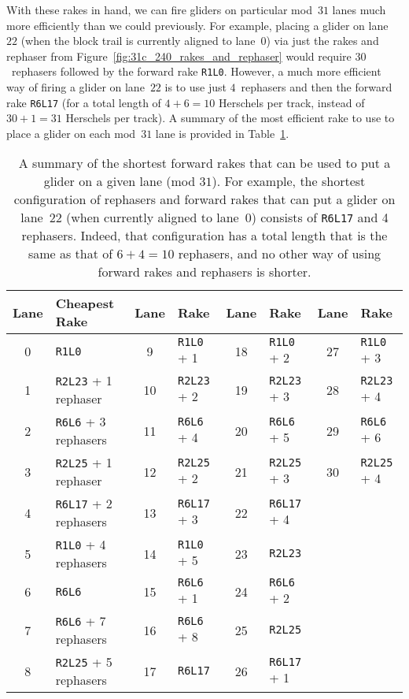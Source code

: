 With these rakes in hand, we can fire gliders on particular mod~$31$ lanes much more efficiently than we could previously. For example, placing a glider on lane~$22$ (when the block trail is currently aligned to lane~$0$) via just the rakes and rephaser from Figure~\ref{fig:31c_240_rakes_and_rephaser} would require $30$~rephasers followed by the forward rake \texttt{R1L0}. However, a much more efficient way of firing a glider on lane~$22$ is to use just $4$~rephasers and then the forward rake \texttt{R6L17} (for a total length of $4 + 6 = 10$ Herschels per track, instead of $30 + 1 = 31$ Herschels per track). A summary of the most efficient rake to use to place a glider on each mod~$31$ lane is provided in Table~\ref{tab:silverfish_forward_rakes}.

\begin{table}[!htbp]
	\centering
	\begin{tabular}{c l | c l | c l | c l}
		\toprule
		Lane & Cheapest Rake & Lane & Rake & Lane & Rake & Lane & Rake \\ \midrule
		0 & \texttt{R1L0} & 9 & \texttt{R1L0} + 1 & 18 & \texttt{R1L0} + 2 & 27 & \texttt{R1L0} + 3 \\
		1 & \texttt{R2L23} + 1 rephaser & 10 & \texttt{R2L23} + 2 & 19 & \texttt{R2L23} + 3 & 28 & \texttt{R2L23} + 4\\
		2 & \texttt{R6L6} + 3 rephasers & 11 & \texttt{R6L6} + 4 & 20 & \texttt{R6L6} + 5 & 29 & \texttt{R6L6} + 6 \\
		3 & \texttt{R2L25} + 1 rephaser & 12 & \texttt{R2L25} + 2 & 21 & \texttt{R2L25} + 3 & 30 & \texttt{R2L25} + 4 \\
		4 & \texttt{R6L17} + 2 rephasers & 13 & \texttt{R6L17} + 3 & 22 & \texttt{R6L17} + 4 & & \\
		5 & \texttt{R1L0} + 4 rephasers & 14 & \texttt{R1L0} + 5 & 23 & \texttt{R2L23} & & \\
		6 & \texttt{R6L6} & 15 & \texttt{R6L6} + 1 & 24 & \texttt{R6L6} + 2 & & \\
		7 & \texttt{R6L6} + 7 rephasers & 16 & \texttt{R6L6} + 8 & 25 & \texttt{R2L25} & & \\
		8 & \texttt{R2L25} + 5 rephasers & 17 & \texttt{R6L17} & 26 & \texttt{R6L17} + 1 & & \\
		\bottomrule
	\end{tabular}
	\caption{A summary of the shortest forward rakes that can be used to put a glider on a given lane (mod $31$). For example, the shortest configuration of rephasers and forward rakes that can put a glider on lane~22 (when currently aligned to lane~0) consists of \texttt{R6L17} and 4 rephasers. Indeed, that configuration has a total length that is the same as that of $6 + 4 = 10$ rephasers, and no other way of using forward rakes and rephasers is shorter.}\label{tab:silverfish_forward_rakes}
\end{table}

